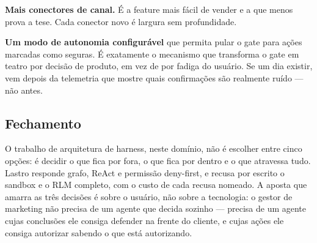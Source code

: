 \documentclass[10pt,twocolumn]{article}
\begin{document}
\textbf{Mais conectores de canal.} É a feature mais fácil de vender e a que menos prova a
tese. Cada conector novo é largura sem profundidade.

\textbf{Um modo de autonomia configurável} que permita pular o gate para ações marcadas como
seguras. É exatamente o mecanismo que transforma o gate em teatro por decisão de produto, em
vez de por fadiga do usuário. Se um dia existir, vem depois da telemetria que mostre quais
confirmações são realmente ruído --- não antes.

\subsection*{Fechamento}

O trabalho de arquitetura de harness, neste domínio, não é escolher entre cinco opções: é
decidir o que fica por fora, o que fica por dentro e o que atravessa tudo. Lastro responde
grafo, ReAct e permissão deny-first, e recusa por escrito o sandbox e o RLM completo, com o
custo de cada recusa nomeado. A aposta que amarra as três decisões é sobre o usuário, não
sobre a tecnologia: o gestor de marketing não precisa de um agente que decida sozinho ---
precisa de um agente cujas conclusões ele consiga defender na frente do cliente, e cujas
ações ele consiga autorizar sabendo o que está autorizando.

\renewcommand{\refname}{References}
{\small

}
\end{document}
